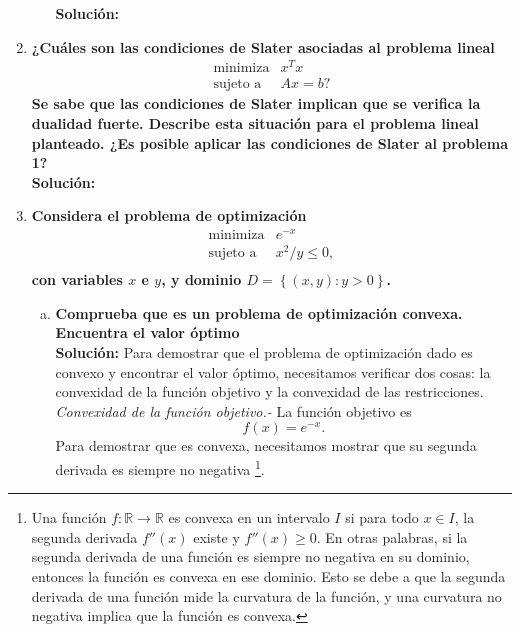 \begin{enumerate}
\begin{enumerate}[\bfseries (a)]
	    \textbf{Solución:}

    \end{enumerate}

    \item \textbf{\boldmath ¿Cuáles son las condiciones de Slater asociadas al problema lineal
    $$
    \begin{array}{ll}
	\text{minimiza} & x^Tx\\
	\text{sujeto a} & Ax=b?
    \end{array}
    $$
    Se sabe que las condiciones de Slater implican que se verifica la dualidad fuerte. Describe esta situación para el problema lineal planteado. ¿Es posible aplicar las condiciones de Slater al problema 1?}\\

	\textbf{Solución:}

    \item \textbf{\boldmath Considera el problema de optimización
    $$
    \begin{array}{ll}
	\text{minimiza} & e^{-x}\\
	\text{sujeto a} & x^2/y\leq 0,\\
    \end{array}
    $$
    con variables $x$ e $y$, y dominio $D=\left\{(x,y):y>0\right\}$.}
    \begin{enumerate}[(a)]

	\item \textbf{\boldmath Comprueba que es un problema de optimización convexa. Encuentra el valor óptimo}\\

	    \textbf{Solución:} Para demostrar que el problema de optimización dado es convexo y encontrar el valor óptimo, necesitamos verificar dos cosas: la convexidad de la función objetivo y la convexidad de las restricciones.\\

	    \textit{Convexidad de la función objetivo.-} La función objetivo es 
	    $$f(x) = e^{-x}.$$ 
	    Para demostrar que es convexa, necesitamos mostrar que su segunda derivada es siempre no negativa 
	    \footnote{
		Una función $f: \mathbb{R} \rightarrow \mathbb{R}$ es convexa en un intervalo $I$ si para todo $x \in I$, la segunda derivada $f''(x)$ existe y $f''(x) \geq 0$. En otras palabras, si la segunda derivada de una función es siempre no negativa en su dominio, entonces la función es convexa en ese dominio. Esto se debe a que la segunda derivada de una función mide la curvatura de la función, y una curvatura no negativa implica que la función es convexa.
	    }. 


\end{enumerate}
\end{enumerate}
